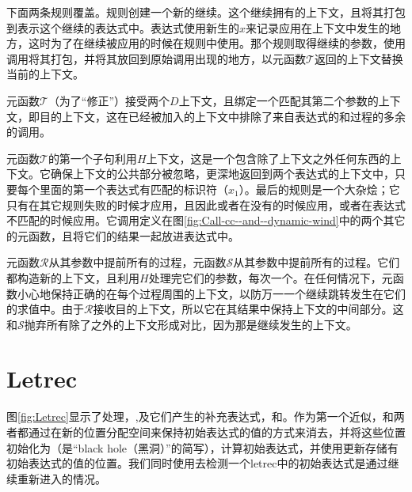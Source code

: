 下面两条规则覆盖。规则创建一个新的继续。这个继续拥有的上下文，且将其打包到表示这个继续的表达式中。表达式使用新生的$x$来记录应用在上下文中发生的地方，这时为了在继续被应用的时候在规则中使用。那个规则取得继续的参数，使用调用将其打包，并将其放回到原始调用出现的地方，以元函数$\mathscr{T}$返回的上下文替换当前的上下文。

元函数$\mathscr{T}$（为了“修正”）接受两个$D$上下文，且绑定一个匹配其第二个参数的上下文，即目的上下文，这在已经被加入的上下文中排除了来自表达式的和过程的多余的调用。

元函数$\mathscr{T}$的第一个子句利用$H$上下文，这是一个包含除了上下文之外任何东西的上下文。它确保上下文的公共部分被忽略，更深地返回到两个表达式的上下文中，只要每个里面的第一个表达式有匹配的标识符（$x_1$）。最后的规则是一个大杂烩；它只有在其它规则失败的时候才应用，且因此或者在没有的时候应用，或者在表达式不匹配的时候应用。它调用定义在图\ref{fig:Call-cc--and--dynamic-wind}中的两个其它的元函数，且将它们的结果一起放进表达式中。

元函数$\mathscr{R}$从其参数中提前所有的过程，元函数$\mathscr{S}$从其参数中提前所有的过程。它们都构造新的上下文，且利用$H$处理完它们的参数，每次一个。在任何情况下，元函数小心地保持正确的在每个过程周围的上下文，以防万一一个继续跳转发生在它们的求值中。由于$\mathscr{R}$接收目的上下文，所以它在其结果中保持上下文的中间部分。这和$\mathscr{S}$抛弃所有除了之外的上下文形成对比，因为那是继续发生的上下文。

\section{Letrec}

\beginfig
\begin{center}

\end{center}
\caption{Letrec和letrec*}
\label{fig:Letrec}
\endfig

图\ref{fig:Letrec}显示了处理，,及它们产生的补充表达式，和。作为第一个近似，和两者都通过在新的位置分配空间来保持初始表达式的值的方式来消去，并将这些位置初始化为（是“black hole（黑洞）”的简写），计算初始表达式，并使用更新存储有初始表达式的值的位置。我们同时使用去检测一个letrec中的初始表达式是通过继续重新进入的情况。


